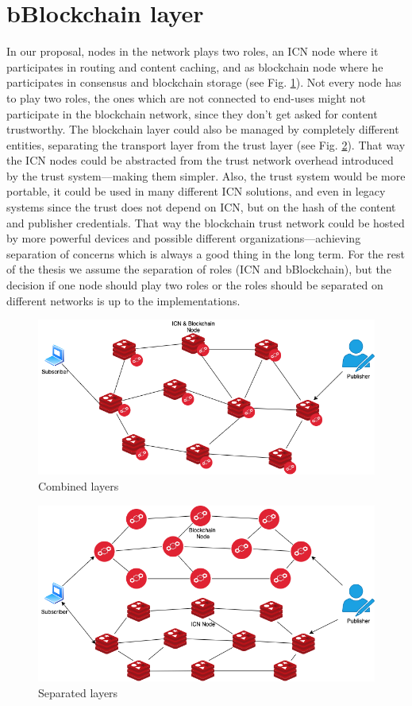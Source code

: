 \section{bBlockchain layer}
In our proposal, nodes in the network plays two roles, an ICN node where it participates in routing and content caching, and as blockchain node where he participates in consensus and blockchain storage (see Fig. \ref{fig:combined_layers}). Not every node has to play two roles, the ones which are not connected to end-uses might not participate in the blockchain network, since they don't get asked for content trustworthy. 
The blockchain layer could also be managed by completely different entities, separating the transport layer from the trust layer (see Fig. \ref{fig:separated_layers}). That way the ICN nodes could be abstracted from the trust network overhead introduced by the trust system––making them simpler. Also, the trust system would be more portable, it could be used in many different ICN solutions, and even in legacy systems since the trust does not depend on ICN, but on the hash of the content and publisher credentials. That way the blockchain trust network could be hosted by more powerful devices and possible different organizations––achieving separation of concerns which is always a good thing in the long term. For the rest of the thesis we assume the separation of roles (ICN and bBlockchain), but the decision if one node should play two roles or the roles should be separated on different networks is up to the implementations.
\begin{figure}[h!]
\centering
\includegraphics[width=1\textwidth]{img/combined-layers.png}
\caption{Combined layers}
\label{fig:combined_layers}
\end{figure}

\begin{figure}[h!]
\centering
\includegraphics[width=1\textwidth]{img/separated-layers.png}
\caption{Separated layers}
\label{fig:separated_layers}
\end{figure}

